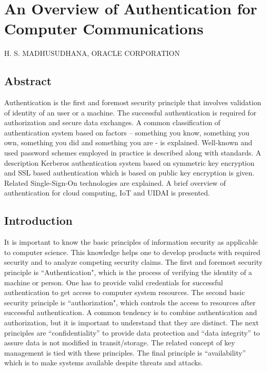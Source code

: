 \chapter{An Overview of Authentication for Computer Communications}

\begin{center}
\uppercase{H. S. Madhusudhana, Oracle Corporation}
\end{center}


\newpage

\begin{multicols}{2}

\section*{Abstract}

\noindent
Authentication is the first and foremost security principle that involves validation of identity of an user or a machine. The successful authentication is required for authorization and secure data exchanges. A common classification of authentication system based on factors -- something you know, something you own, something you did and something you are - is explained. Well-known and used password schemes employed in practice is described along with standards. A description Kerberos authentication system based on symmetric key encryption and SSL based authentication which is based on public key encryption is given. Related Single-Sign-On technologies are explained. A brief overview of authentication for cloud computing, IoT and UIDAI is presented.\\[-22pt]

\section*{Introduction}

\vskip -3pt

It is important to know the basic principles of information security as applicable to computer science. This knowledge helps one to develop products with required security and to analyze competing security claims. The first and foremost security principle is ``Authentication", which is the process of verifying the identity of a machine or person. One has to provide valid credentials for successful authentication to get access to computer system resources. The second basic security principle is ``authorization", which controls the access to resources after successful authentication. A common tendency is to combine authentication and authorization, but it is important to understand that they are distinct. The next principles are ``confidentiality'' to provide data protection and ``data integrity'' to assure data is not modified in transit/storage. The related concept of key management is tied with these principles. The final principle is ``availability'' which is to make systems available despite threats and attacks.


\end{multicols}
